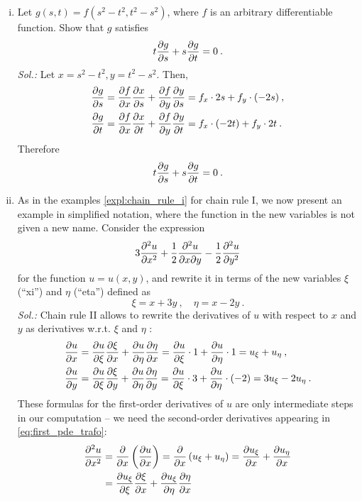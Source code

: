 \begin{example}
\begin{enumerate}[(i)]
	\item Let $g(s, t)=f(s^2-t^2, t^2-s^2)$, where $f$ is an arbitrary differentiable function. Show that $g$ satisfies
	\[ t\displaystyle{\frac{\partial g}{\partial s}} + s \displaystyle{\frac{\partial g}{\partial t}}=0 \:. \]
	{\it Sol.:}
	Let $ x=s^2-t^2, y=t^2-s^2$. Then,
	\begin{equation*}
	\begin{split}
	\displaystyle{\frac{\partial g}{\partial s}} & = \displaystyle{\frac{\partial f}{\partial x}} \displaystyle{\frac{\partial x}{\partial s}} + \displaystyle{\frac{\partial f}{\partial y}} \displaystyle{\frac{\partial y}{\partial s}}=f_x \cdot 2s + f_y \cdot (-2s) \:, \\
	\displaystyle{\frac{\partial g}{\partial t}} & = \displaystyle{\frac{\partial f}{\partial x}} \displaystyle{\frac{\partial x}{\partial t}} + \displaystyle{\frac{\partial f}{\partial y}} \displaystyle{\frac{\partial y}{\partial t}}=f_x \cdot (-2t) + f_y \cdot 2t \:.
	\end{split}
	\end{equation*}
	Therefore
	\[ t\displaystyle{\frac{\partial g}{\partial s}} + s \displaystyle{\frac{\partial g}{\partial t}}=0 \:. \]
	\item As in the examples \ref{expl:chain_rule_i} for chain rule I, we now present an example in simplified notation, where the function in the new variables is not given a new name. Consider the expression
	\begin{equation}
	\label{eq:first_pde_trafo}
	3\ddf{u}{x} +\frac12 \dff{u}{x}{y} -\frac12 \ddf{u}{y} 
	\end{equation}
	for the function $u=u(x,y)$, and rewrite it in terms of the new variables $\xi$ (``xi'') and $\eta$ (``eta'') defined as 
	\[ \xi=x+3y \:, \quad \eta=x-2y \:. \]
	{\it Sol.:} Chain rule II allows to rewrite the derivatives of $u$ with respect to $x$ and $y$ as derivatives w.r.t. $\xi$ and $\eta$ :
	\begin{equation*}
	\begin{split}
	\displaystyle{\frac{\partial u}{\partial x}} &= \displaystyle{\frac{\partial u}{\partial \xi}} \displaystyle{\frac{\partial \xi}{\partial x}} + \displaystyle{\frac{\partial u}{\partial \eta}} \displaystyle{\frac{\partial \eta}{\partial x}}
	 = \displaystyle{\frac{\partial u}{\partial \xi}} \cdot 1 + \displaystyle{\frac{\partial u}{\partial \eta}} \cdot 1 = u_{\xi} + u_{\eta} \:, \\
 	\displaystyle{\frac{\partial u}{\partial y}} &= \displaystyle{\frac{\partial u}{\partial \xi}} \displaystyle{\frac{\partial \xi}{\partial y}} + \displaystyle{\frac{\partial u}{\partial \eta}} \displaystyle{\frac{\partial \eta}{\partial y}}
	 = \displaystyle{\frac{\partial u}{\partial \xi}} \cdot 3 + \displaystyle{\frac{\partial u}{\partial \eta}} \cdot \left( -2 \right) 
	 = 3u_{\xi} - 2 u_{\eta} \:.
	 \end{split}
	\end{equation*}
	These formulas for the first-order derivatives of $u$ are only intermediate steps in our computation -- we need the second-order derivatives appearing in \eqref{eq:first_pde_trafo}: 
	\begin{equation*}
	\begin{split}
	\ddf{u}{x} & = \df{}{x}\left( \df{u}{x} \right)
		= \df{}{x} \left( u_{\xi} + u_{\eta} \right)
		= \df{u_{\xi}}{x} + \df{u_{\eta}}{x} \\
		& = \df{u_{\xi}}{\xi} \df{\xi}{x} + \df{u_{\xi}}{\eta} \df{\eta}{x}

\end{split}
\end{equation*}
\end{enumerate}
\end{example}
